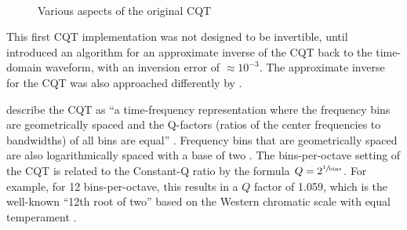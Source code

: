 \documentclass[report.tex]{subfiles}
\begin{document}
\begin{figure}[ht]
	\centering
	\\
	\caption{Various aspects of the original CQT \parencite[427, 428]{jbrown}}
	\label{fig:jbrowncqt}
\end{figure}

This first CQT implementation was not designed to be invertible, until \textcite{klapuricqt} introduced an algorithm for an approximate inverse of the CQT back to the time-domain waveform, with an inversion error of $\approx 10^{-3}$. The approximate inverse for the CQT was also approached differently by \textcite{fitzgeraldcqt}.

\citeauthor{klapuricqt} describe the CQT as ``a time-frequency representation where the frequency bins are geometrically spaced and the Q-factors (ratios of the center frequencies to bandwidths) of all bins are equal'' \parencite[1]{klapuricqt}. Frequency bins that are geometrically spaced are also logarithmically spaced with a base of two \parencite{geometriclog}. The bins-per-octave setting of the CQT is related to the Constant-Q ratio by the formula $Q = 2^{\sfrac{1}{\text{bins}}}$. For example, for 12 bins-per-octave, this results in a $Q$ factor of 1.059, which is the well-known ``12th root of two'' based on the Western chromatic scale with equal temperament \parencite{westernpitch1, westernpitch2}.
\end{document}
